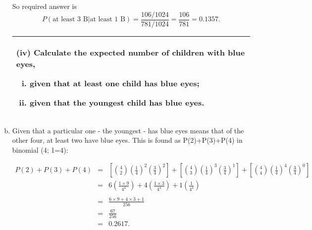 \documentclass[a4paper,12pt]{article}
\begin{document}
\begin{enumerate}[(a)]
So required answer is \[ P(\mbox{at least 3 B} | \mbox{at least 1 B}) = \frac{106/1024}{781/1024} = \frac{106}{781} = 0.1357. \]

\newpage
  \begin{table}[ht!]
     \centering
     \begin{tabular}{|p{15cm}|}
     \hline  
(iv) Calculate the expected number of children with blue eyes,
\begin{enumerate}[(i)]
\item given that at least one child has blue eyes;
\item given that the youngest child has blue eyes.
\end{enumerate}
\\ \hline
      \end{tabular}
    \end{table}
\item Given that a particular one - the youngest - has blue eyes means that of the
other four, at least two have blue eyes. This is found as P(2)+P(3)+P(4) in
binomial (4; 1=4): 

\begin{eqnarray*} 
P(2)+P(3)+P(4) &=& 
\left[ { 4 \choose 2}
\left( \frac{1}{4} \right) ^2 \left(\frac{3}{4}\right)^2 \right]+ 
\left[ { 4 \choose 3}
\left( \frac{1}{4} \right) ^3  \left(\frac{3}{4}\right)^1 \right]
+\left[ { 4 \choose 4}
\left( \frac{1}{4} \right) ^4  \left(\frac{3}{4}\right)^{0} \right]
\\ &=& 6 \left(\frac{1 \times 9}{4^4}\right) + 4 \left(\frac{1 \times 3}{4^4}\right) + 1 \left(\frac{1}{4^4}\right)\\
\\ &=&  \frac{6\times 9+4 \times 3+1}{256}    \\
 &=& \frac{67}{256} \\
 &=& 0.2617.
\end{eqnarray*}


\end{enumerate}
\end{document}
